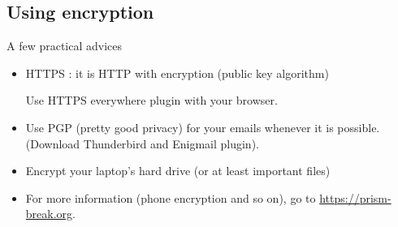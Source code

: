 \documentclass[compress]{beamer}
\theoremstyle{definition}
\theoremstyle{definition}
\theoremstyle{definition}
\theoremstyle{remark}
\theoremstyle{remark}
\theoremstyle{definition}
\theoremstyle{definition}
\theoremstyle{definition}
\theoremstyle{definition}
\theoremstyle{definition}
\theoremstyle{remark}
\theoremstyle{remark}
\theoremstyle{remark}
\theoremstyle{remark}
\begin{document}
			\subsection{Using encryption}
				\begin{frame}
					\begin{block}{A few practical advices}
					\begin{itemize}
						\item HTTPS : it is HTTP with encryption (public key algorithm)
					
							Use HTTPS everywhere plugin with your browser.
							\vspace*{10mm}
							
						\item Use PGP (pretty good privacy) for your emails whenever it is possible. (Download Thunderbird and Enigmail plugin).
						\vspace*{10mm}
						\item Encrypt your laptop's hard drive (or at least important files)
						\vspace*{10mm}
						\item For more information (phone encryption and so on), go to \url{https://prism-break.org}.
					\end{itemize}
					\end{block}
				\end{frame}
		
\end{document}
